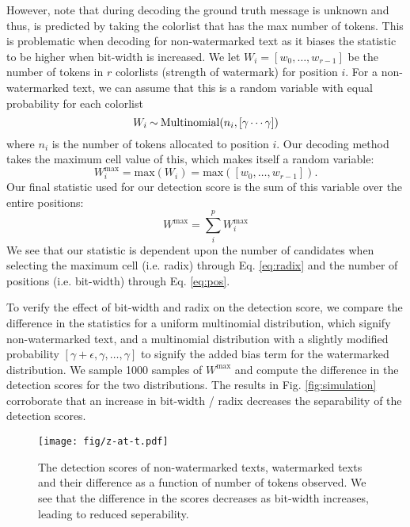 However, note that during decoding the ground truth message is unknown and thus, is predicted by taking the colorlist that has the max number of tokens. This is problematic when decoding for non-watermarked text as it biases the statistic to be higher when bit-width is increased. We let $W_i=[w_0, \dots, w_{r-1}]$ be the number of tokens in $r$ colorlists (strength of watermark) for position $i$. For a non-watermarked text, we can assume that this is a random variable with equal probability for each colorlist 
\begin{equation}
    W_i\distas{} \text{Multinomial}(n_i, [\gamma \cdots \gamma])
\end{equation}
where $n_i$ is the number of tokens allocated to position $i$. Our decoding method takes the maximum cell value of this, which makes itself a random variable:
\begin{equation}\label{eq:radix}
    W^\text{max}_i = \mathrm{max}(W_i) =  \mathrm{max}([w_0,\dots,w_{r-1}]).
\end{equation}
Our final statistic used for our detection score is the sum of this variable over the entire positions: 
\begin{equation}\label{eq:pos}
    W^\text{max} = \sum_i^{p} W^\text{max}_i
\end{equation}
We see that our statistic is dependent upon the number of candidates when selecting the maximum cell (i.e. radix) through Eq. \ref{eq:radix} and the number of positions (i.e. bit-width) through Eq. \ref{eq:pos}.


To verify the effect of bit-width and radix on the detection score, we compare the difference in the statistics for a uniform multinomial distribution, which signify non-watermarked text, and a multinomial distribution with a slightly modified probability $[\gamma + \epsilon, \gamma, \dots ,\gamma]$ to signify the added bias term for the watermarked distribution. We sample 1000 samples of $W^\text{max}$ and compute the difference in the detection scores for the two distributions. The results in Fig. \ref{fig:simulation} corroborate that an increase in bit-width / radix decreases the separability of the detection scores. 



\begin{figure}
    \centering
    \texttt{[image: fig/z-at-t.pdf]}
    \caption{The detection scores of non-watermarked texts, watermarked texts and their difference as a function of number of tokens observed. We see that the difference in the scores decreases as bit-width increases, leading to reduced seperability.}
    \label{fig:z-at-t}
\end{figure}



